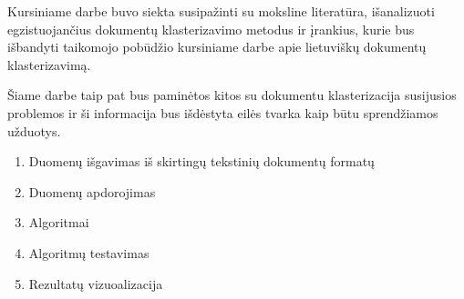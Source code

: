 \documentclass{VUMIFInfKursinis}
\begin{document}
	Kursiniame darbe buvo siekta susipažinti su moksline literatūra, išanalizuoti egzistuojančius dokumentų klasterizavimo metodus ir įrankius, kurie bus išbandyti taikomojo pobūdžio  kursiniame darbe apie lietuviškų dokumentų klasterizavimą.

	Šiame darbe taip pat bus paminėtos kitos su dokumentu klasterizacija susijusios problemos ir ši informacija bus išdėstyta eilės tvarka kaip būtu sprendžiamos užduotys.
	\begin{enumerate}
		\item Duomenų išgavimas iš skirtingų tekstinių dokumentų formatų
		\item Duomenų apdorojimas
		\item Algoritmai
		\item Algoritmų testavimas
		\item Rezultatų vizuoalizacija
	\end{enumerate}
\end{document}
